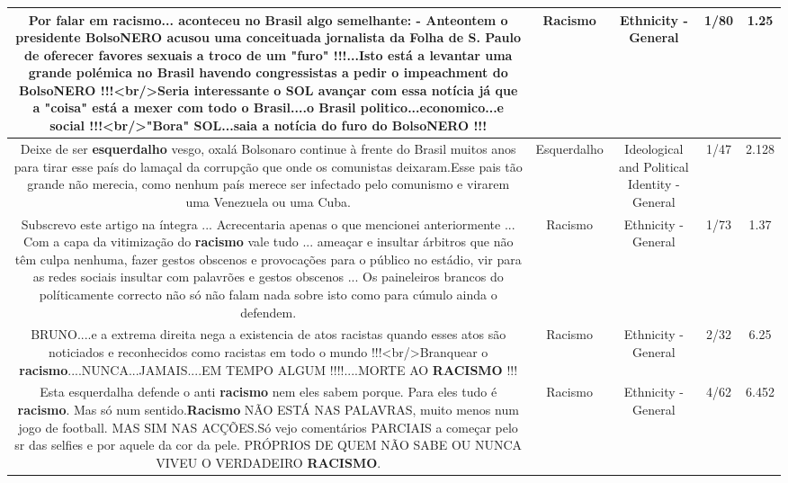\documentclass[11pt]{article}
\newlength\mylength
\begin{document}
\begin{center}
\begin{longtable}{|C{.65\mylength}|C{.30\mylength}|C{.12\mylength}|C{.12\mylength}|C{.12\mylength}|}
  \small Por falar em \textbf{racismo}... aconteceu no Brasil algo semelhante: -  Anteontem o presidente BolsoNERO acusou uma conceituada jornalista da Folha de S. Paulo de oferecer favores sexuais a troco de um "furo" !!!...Isto está a levantar uma grande polémica no Brasil havendo congressistas a pedir o impeachment do BolsoNERO !!!<br/>Seria interessante o SOL avançar com essa notícia já que a "coisa" está a mexer com todo o Brasil....o Brasil politico...economico...e social !!!<br/>"Bora" SOL...saia a notícia do furo do BolsoNERO !!!\normalsize   & Racismo & Ethnicity - General & 1/80 & 1.25 \\  \hline
  \small Deixe de ser \textbf{esquerdalho} vesgo, oxalá Bolsonaro continue à frente do Brasil muitos anos para tirar esse país do lamaçal da corrupção que onde os comunistas deixaram.Esse pais tão grande não merecia, como nenhum país merece ser infectado pelo comunismo e virarem uma Venezuela ou uma Cuba.\normalsize   & Esquerdalho & Ideological and Political Identity - General & 1/47 & 2.128 \\  \hline
  \small Subscrevo este artigo na íntegra ... Acrecentaria apenas o que mencionei anteriormente ... Com a capa da vitimização do \textbf{racismo} vale tudo ... ameaçar e insultar árbitros que não têm culpa nenhuma, fazer gestos obscenos e provocações para o público no estádio, vir para as redes sociais insultar com palavrões e gestos obscenos ... Os paineleiros brancos do políticamente correcto não só não falam nada sobre isto como para cúmulo ainda o defendem.\normalsize   & Racismo & Ethnicity - General & 1/73 & 1.37 \\  \hline
  \small BRUNO....e a extrema direita nega a existencia de atos racistas quando esses atos são noticiados e reconhecidos como racistas em todo o mundo !!!<br/>Branquear o \textbf{racismo}....NUNCA...JAMAIS....EM TEMPO ALGUM !!!!....MORTE AO \textbf{RACISMO} !!!\normalsize   & Racismo & Ethnicity - General & 2/32 & 6.25 \\  \hline
  \small Esta esquerdalha defende o anti \textbf{racismo} nem eles sabem porque. Para eles tudo é \textbf{racismo}. Mas só num sentido.\textbf{Racismo} NÃO ESTÁ NAS PALAVRAS, muito menos num jogo de football. MAS SIM NAS ACÇÕES.Só vejo comentários PARCIAIS  a começar pelo sr das selfies e por aquele da cor da pele. PRÓPRIOS DE QUEM NÃO SABE OU NUNCA VIVEU O VERDADEIRO \textbf{RACISMO}.\normalsize   & Racismo & Ethnicity - General & 4/62 & 6.452 \\  \hline

\end{longtable}
\end{center}
\end{document}
